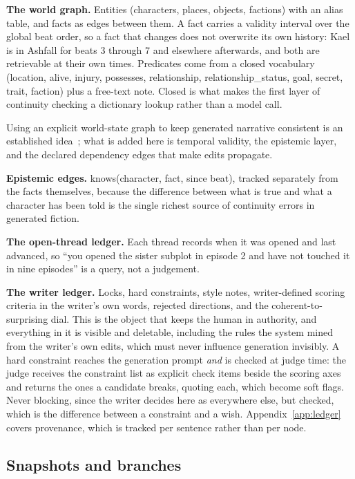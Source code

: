 \documentclass{article}
\begin{document}
\textbf{The world graph.} Entities (characters, places, objects, factions) with an alias
table, and facts as edges between them. A fact carries a validity interval over the
global beat order, so a fact that changes does not overwrite its own history: Kael is in
Ashfall for beats 3 through 7 and elsewhere afterwards, and both are retrievable at their
own times. Predicates come from a closed vocabulary
(\textsf{location}, \textsf{alive}, \textsf{injury}, \textsf{possesses},
\textsf{relationship}, \textsf{relationship\_status}, \textsf{goal}, \textsf{secret},
\textsf{trait}, \textsf{faction}) plus a free-text \textsf{note}. Closed is what makes the
first layer of continuity checking a dictionary lookup rather than a model call.

Using an explicit world-state graph to keep generated narrative consistent is an
established idea~\cite{ammanabrolu2020stories}; what is added here is temporal validity,
the epistemic layer, and the declared dependency edges that make edits propagate.

\textbf{Epistemic edges.} \textsf{knows}(character, fact, since beat), tracked separately
from the facts themselves, because the difference between what is true and what a
character has been told is the single richest source of continuity errors in generated
fiction.

\textbf{The open-thread ledger.} Each thread records when it was opened and last
advanced, so ``you opened the sister subplot in episode 2 and have not touched it in
nine episodes'' is a query, not a judgement.

\textbf{The writer ledger.} Locks, hard constraints, style notes, writer-defined scoring
criteria in the writer's own words, rejected directions, and the coherent-to-surprising
dial. This is the object that keeps the human in authority, and everything in it is visible
and deletable, including the rules the system mined from the writer's own edits, which must
never influence generation invisibly. A hard constraint reaches the generation prompt \emph{and} is checked at judge
time: the judge receives the constraint list as explicit check items beside the scoring axes
and returns the ones a candidate breaks, quoting each, which become soft flags. Never
blocking, since the writer decides here as everywhere else, but checked, which is the
difference between a constraint and a wish. Appendix~\ref{app:ledger} covers provenance,
which is tracked per sentence rather than per node.

\subsection{Snapshots and branches}
\end{document}
